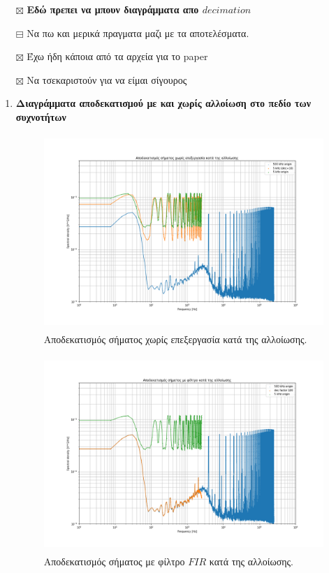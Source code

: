 \documentclass[breaklines=true, 12pt]{article}
\begin{document}
\begin{itemize}
\item[{$\boxtimes$}] \textbf{Εδώ πρεπει να μπουν διαγράμματα απο \(decimation\)}
\item[{$\boxminus$}] Να πω και μερικά πραγματα μαζι με τα αποτελέσματα.
\item[{$\boxtimes$}] Έχω ήδη κάποια από τα αρχεία για το paper
\item[{$\boxtimes$}] Να τσεκαριστούν για να είμαι σίγουρος
\end{itemize}
\begin{enumerate}
\item \textbf{Διαγράμματα αποδεκατισμού με και χωρίς αλλοίωση στο πεδίο των συχνοτήτων}
\label{sec:orgb1744cb}
\begin{figure}[htbp]
\centering
\includegraphics[width=500px,height=280px]{./decimation/with_aliasing.png}
\caption{Αποδεκατισμός σήματος χωρίς επεξεργασία κατά της αλλοίωσης.}
\end{figure}

\begin{figure}[htbp]
\centering
\includegraphics[width=500px,height=280px]{./decimation/anti_aliasing_fir.png}
\caption{Αποδεκατισμός σήματος με φίλτρο \(FIR\) κατά της αλλοίωσης.}
\end{figure}


\end{enumerate}
\end{document}
